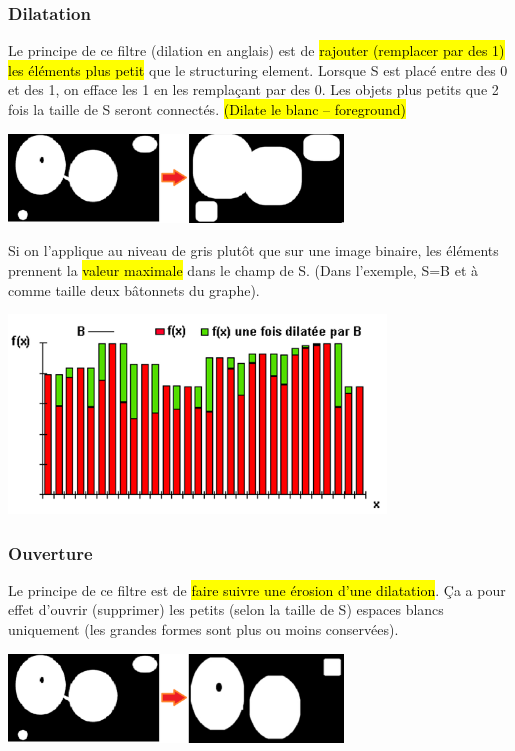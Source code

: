 \documentclass[letterpaper, 12pt]{article}
\newcommand{\alinea}{
\hspace*{0.5cm}}
\begin{document}
		\subsubsection{Dilatation}
			\alinea Le principe de ce filtre (dilation en anglais) est de \hl{rajouter (remplacer par des 1) les éléments plus petit} 
				que le structuring element.	Lorsque S est placé  entre des 0 et des 1, on efface les 1 en les remplaçant par des 0. 
				Les objets plus petits que 2 fois la taille de S seront connectés. \hl{(Dilate le blanc -- foreground)}
			\begin{center}
				\includegraphics[width=3.5in]{Images/dilation}
			\end{center}
			\begin{minipage}{0.33\textwidth}
				\alinea Si on l'applique au niveau de gris plutôt que sur une image binaire, les éléments prennent la \hl{valeur maximale}
					dans le champ de S. (Dans l'exemple, S=B et à comme taille deux bâtonnets du graphe).
			\end{minipage} \hfill
			\begin{minipage}{0.66\textwidth}
				\begin{center}
					\includegraphics[width=3.95in]{Images/dilation2}
				\end{center}
			\end{minipage}
		\subsubsection{Ouverture}
			\alinea Le principe de ce filtre est de \hl{faire suivre une érosion d'une dilatation}. Ça a pour effet d'ouvrir (supprimer) 
				les petits (selon la taille de S) espaces blancs uniquement (les grandes formes sont plus ou moins conservées).
			\begin{center}
				\includegraphics[width=3.5in]{Images/opening}
			\end{center}
\end{document}
